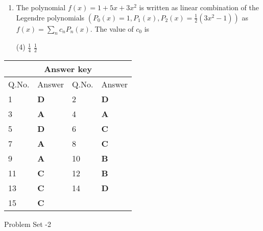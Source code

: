 \begin{enumerate}[label=\color{ocre}\textbf{\arabic*.}]
	{}
	\begin{tasks}(4)
		\task[\textbf{A.}] $n+2$
		\task[\textbf{B.}]  $n-1$
		\task[\textbf{C.}] $n+1$
		\task[\textbf{D.}] $n$
	\end{tasks}
	\item The polynomial $f(x)=1+5 x+3 x^{2}$ is written as linear combination of the Legendre polynomials
	$\left(P_{0}(x)=1, P_{1}(x), P_{2}(x)=\frac{1}{2}\left(3 x^{2}-1\right)\right)$ as $f(x)=\sum_{n} c_{n} P_{n}(x)$. The value of $c_{0}$ is
	{}
	\begin{tasks}(4)
		\task[\textbf{A.}] $\frac{1}{4}$
		\task[\textbf{B.}] $\frac{1}{2}$
	\end{tasks}
\end{enumerate}
\setlength\arrayrulewidth{1pt}
\begin{table}[H]
	\centering
	\begin{tabular}{|p{1.5cm}|p{1.5cm}||p{1.5cm}|p{1.5cm}|}
		\hline
		\multicolumn{4}{|c|}{\textbf{Answer key}}\\\hline\hline
		\rowcolor{ocrel}Q.No.&Answer&Q.No.&Answer\\\hline
		1&\textbf{D} &2&\textbf{D}\\\hline 
		3&\textbf{A} &4&\textbf{A} \\\hline
		5&\textbf{D} &6&\textbf{C} \\\hline
		7&\textbf{A}&8&\textbf{C}\\\hline
		9&\textbf{A}&10&\textbf{B}\\\hline
		11&\textbf{C} &12&\textbf{B}\\\hline
		13&\textbf{C}&14&\textbf{D}\\\hline
		15&\textbf{C}& &\\\hline
		
	\end{tabular}
\end{table}\newpage 
\begin{abox}
	Problem Set -2
\end{abox}
